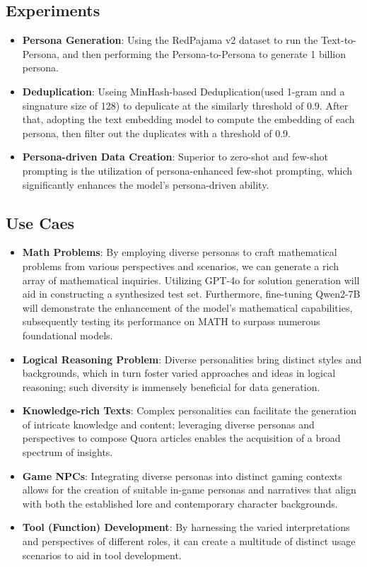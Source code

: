 \subsection{Experiments}
\begin{itemize}
    \item \textbf{Persona Generation}: Using the RedPajama v2 dataset to run the Text-to-Persona, and then performing the Persona-to-Persona to generate 1 billion persona.
    \item \textbf{Deduplication}: Useing MinHash-based Deduplication(used 1-gram and a singnature size of 128) to depulicate at the similarly threshold of 0.9. After that, adopting the text embedding model to compute the embedding of each persona, then filter out the duplicates with a threshold of 0.9.
    \item \textbf{Persona-driven Data Creation}: Superior to zero-shot and few-shot prompting is the utilization of persona-enhanced few-shot prompting, which significantly enhances the model's persona-driven ability.
\end{itemize}



\subsection{Use Caes}
\begin{itemize}
    \item \textbf{Math Problems}: By employing diverse personas to craft mathematical problems from various perspectives and scenarios, we can generate a rich array of mathematical inquiries. Utilizing GPT-4o for solution generation will aid in constructing a synthesized test set. Furthermore, fine-tuning Qwen2-7B will demonstrate the enhancement of the model's mathematical capabilities, subsequently testing its performance on MATH to surpass numerous foundational models.
    \item \textbf{Logical Reasoning Problem}: Diverse personalities bring distinct styles and backgrounds, which in turn foster varied approaches and ideas in logical reasoning; such diversity is immensely beneficial for data generation.
    \item \textbf{Knowledge-rich Texts}: Complex personalities can facilitate the generation of intricate knowledge and content; leveraging diverse personas and perspectives to compose Quora articles enables the acquisition of a broad spectrum of insights.
    \item \textbf{Game NPCs}: Integrating diverse personas into distinct gaming contexts allows for the creation of suitable in-game personas and narratives that align with both the established lore and contemporary character backgrounds.
    \item \textbf{Tool (Function) Development}: By harnessing the varied interpretations and perspectives of different roles, it can create a multitude of distinct usage scenarios to aid in tool development.
\end{itemize}